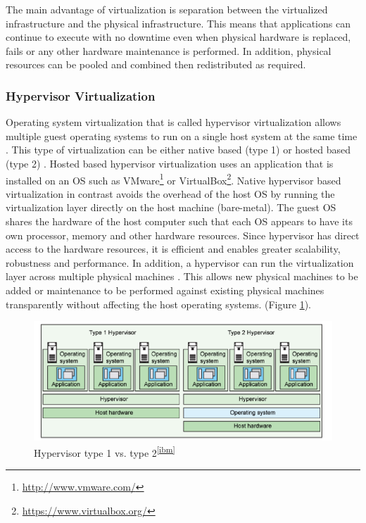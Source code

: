 \documentclass[a4paper,11pt,twoside]{report}
\begin{document}
The main advantage of virtualization is separation between the virtualized infrastructure and the physical infrastructure. This means that applications can continue to execute with no downtime even when physical hardware is replaced, fails or any other hardware maintenance is performed. In addition, physical resources can be pooled and combined then redistributed as required.

\subsubsection*{Hypervisor Virtualization}
Operating system virtualization that is called hypervisor virtualization allows multiple guest operating systems to run on a single host system at the same time \cite{Hypervisors2}. This type of virtualization can be either native based (type 1) or hosted based (type 2) \cite{Hypervisors}. Hosted based hypervisor virtualization uses an application that is installed on an OS such as VMware\footnote{\url{http://www.vmware.com/}} or VirtualBox\footnote{\url {https://www.virtualbox.org/}}. Native hypervisor based virtualization in contrast avoids the overhead of the host OS by running the virtualization layer directly on the host machine (bare-metal). The guest OS shares the hardware of the host computer such that each OS appears to have its own processor, memory and other hardware resources. Since hypervisor has direct access to the hardware resources, it is efficient and enables greater scalability, robustness and performance. In addition, a hypervisor can run the virtualization layer across multiple physical machines \cite{Hypervisors}. This allows new physical machines to be added or maintenance to be performed against existing physical machines transparently without affecting the host operating systems. (Figure \ref{Hypervisor}).\bigskip

\begin{figure}[!ht]
  \centering
     \includegraphics[scale=1]{Hypervisor}
  \caption{Hypervisor type 1 vs. type 2\textsuperscript{\ref{ibm}}}%
  \label{Hypervisor}
\end{figure}
\end{document}
